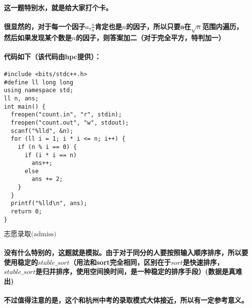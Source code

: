\documentclass[final,11pt,oneside,UTF8]{report}
\begin{document}
\paragraph{这一题特别水，就是给大家打个卡。}
\paragraph{很显然的，对于每一个因子$a$,$\frac{n}{a}$肯定也是$n$的因子，所以只要a在$\sqrt{n}$范围内遍历，然后如果发现某个数是$n$的因子，则答案加二（对于完全平方，特判加一）}
\paragraph{
    代码如下（该代码由hpc提供）：
}
{
    \mono
    \begin{lstlisting}
#include <bits/stdc++.h>
#define ll long long
using namespace std;
ll n, ans;
int main() {
  freopen("count.in", "r", stdin);
  freopen("count.out", "w", stdout);
  scanf("%lld", &n);
  for (ll i = 1; i * i <= n; i++) {
    if (n % i == 0) {
      if (i * i == n)
        ans++;
      else
        ans += 2;
    }
  }
  printf("%lld\n", ans);
  return 0;
}
    \end{lstlisting}
}
\newpage
\centerline{\LARGE{$\textbf{志愿录取}\text{(admiss)}$}}
\paragraph{
    没有什么特别的，这题就是模拟。由于对于同分的人要按照输入顺序排序，所以要使用稳定的$stable\_sort$（用法和sort完全相同，区别在于$sort$是快速排序，$stable\_sort$是归并排序，使用空间换时间，是一种稳定的排序手段）(数据是真难出)
}
\paragraph{
    不过值得注意的是，这个和杭州中考的录取模式大体接近，所以有一定参考意义。
}
\end{document}
